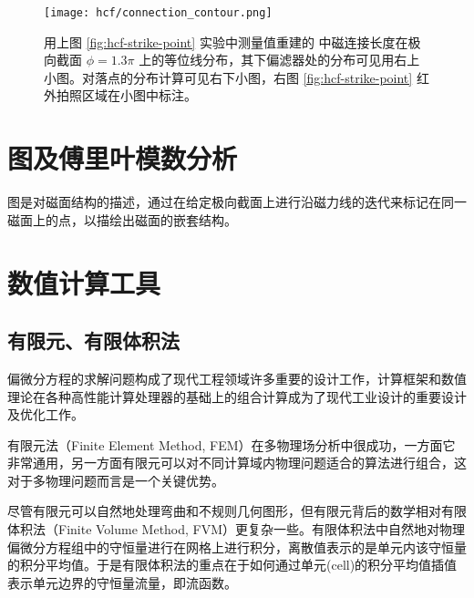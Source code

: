 \begin{figure}[htbp]
    \centering%
        \texttt{[image: hcf/connection\_contour.png]}
        \caption{用上图 \ref{fig:hcf-strike-point} 实验中测量值重建的 \east 中磁连接长度在极向截面 $\phi=1.3\pi$ 上的等位线分布，其下偏滤器处的分布可见用右上小图。对落点的分布计算可见右下小图，右图 \ref{fig:hcf-strike-point} 红外拍照区域在小图中标注。}
        \label{fig:hcf-connection}
\end{figure}


\section{\Poincare 图及傅里叶模数分析}
\Poincare 图是对磁面结构的描述，通过在给定极向截面上进行沿磁力线的迭代来标记在同一磁面上的点，以描绘出磁面的嵌套结构。

\section{数值计算工具}
\subsection{有限元、有限体积法}
偏微分方程的求解问题构成了现代工程领域许多重要的设计工作，计算框架和数值理论在各种高性能计算处理器的基础上的组合计算成为了现代工业设计的重要设计及优化工作。

有限元法（Finite Element Method, FEM）在多物理场分析中很成功，一方面它非常通用，另一方面有限元可以对不同计算域内物理问题适合的算法进行组合，这对于多物理问题而言是一个关键优势。

尽管有限元可以自然地处理弯曲和不规则几何图形，但有限元背后的数学相对有限体积法（Finite Volume Method, FVM）更复杂一些。有限体积法中自然地对物理偏微分方程组中的守恒量进行在网格上进行积分，离散值表示的是单元内该守恒量的积分平均值。于是有限体积法的重点在于如何通过单元(cell)的积分平均值插值表示单元边界的守恒量流量，即流函数。


